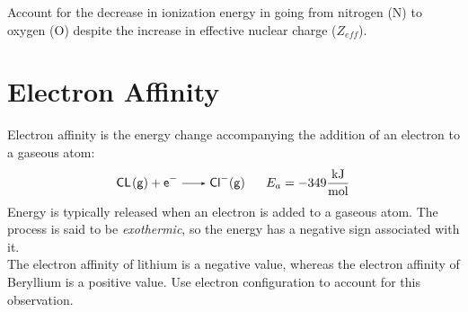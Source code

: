 \documentclass[
	chapter=8,
	title={Periodic Properties of the Elements},
	showanswers=true,
]{chem122notes}
\begin{document}
Account for the decrease in ionization energy in going from nitrogen (N) to oxygen (O) despite the increase in effective nuclear charge ($Z_{eff}$).

\begin{answer}
\end{answer}

\section{Electron Affinity}\label{sec:electron-affinity}
Electron affinity is the energy change accompanying the addition of an electron to a gaseous atom:
\begin{equation*}
\begin{aligned}
	\ce{CL(g) + e- ->  Cl-(g)}\ \ \ \ \ E_{a} = -349 \frac{\mbox{kJ}}{\mbox{mol}}
\end{aligned}
\end{equation*}
Energy is typically released when an electron is added to a gaseous atom.
The process is said to be \emph{exothermic}, so the energy has a negative sign associated with it.\\

The electron affinity of lithium is a negative value, whereas the electron affinity of Beryllium is a positive value.
Use electron configuration to account for this observation.
\end{document}
